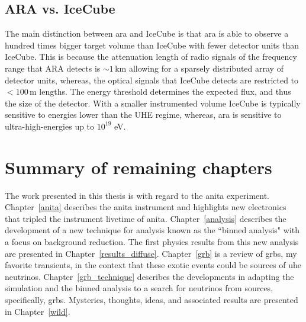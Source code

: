 \subsection{ARA vs. IceCube} 

The main distinction between \gls{ara} and IceCube is that \gls{ara} is able to observe a hundred times bigger target volume than IceCube with fewer detector units than IceCube. This is because the attenuation length of radio signals of the frequency range that ARA detects is $\sim 1 \, \mathrm{km}$ allowing for a sparsely distributed array of detector units, whereas, the optical signals that IceCube detects are restricted to $< 100 \, \mathrm{m}$ lengths. 
The energy threshold determines the expected flux, and thus the size of the detector. 
With a smaller instrumented volume IceCube is typically sensitive to energies lower than the UHE regime, whereas, \gls{ara} is sensitive to ultra-high-energies up to $10^{19}$ eV. 


\section{Summary of remaining chapters}

The work presented in this thesis is with regard to the \gls{anita} experiment. 
Chapter~\ref{anita} describes the \gls{anita} instrument and highlights new electronics that tripled the instrument livetime of \gls{anita}. Chapter~\ref{analysis} describes the development of a new technique for analysis known as the ``binned analysis" with a focus on background reduction. The first physics results from this new analysis are presented in Chapter~\ref{results_diffuse}. Chapter~\ref{grb} is a review of \gls{grbs}, my favorite transients, in the context that these exotic events could be sources of \gls{uhe} neutrinos. Chapter~\ref{grb_technique} describes the developments in adapting the simulation and the binned analysis to a search for neutrinos from sources, specifically, \gls{grbs}. Mysteries, thoughts, ideas, and associated results are presented in Chapter~\ref{wild}.